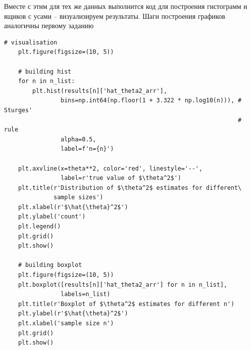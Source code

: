 \documentclass[a4paper, 12pt]{article}
\begin{document}
    Вместе с этим для тех же данных выполнится код для построения гистограмм и ящиков с усами -- визуализируем результаты.
    Шаги построения графиков аналогичны первому заданию
    \begin{lstlisting}[label=graphs2, caption={Код для визуализации результатов}]
    # visualisation
    plt.figure(figsize=(10, 5))

    # building hist
    for n in n_list:
        plt.hist(results[n]['hat_theta2_arr'], 
                bins=np.int64(np.floor(1 + 3.322 * np.log10(n))), # Sturges'
                                                                  # rule
                alpha=0.5, 
                label=f'n={n}')

    plt.axvline(x=theta**2, color='red', linestyle='--',
                label=r'true value of $\theta^2$')
    plt.title(r'Distribution of $\theta^2$ estimates for different\
              sample sizes')
    plt.xlabel(r'$\hat{\theta}^2$')
    plt.ylabel('count')
    plt.legend()
    plt.grid()
    plt.show()

    # building boxplot
    plt.figure(figsize=(10, 5))
    plt.boxplot([results[n]['hat_theta2_arr'] for n in n_list],
                labels=n_list)
    plt.title(r'Boxplot of $\theta^2$ estimates for different n')
    plt.ylabel(r'$\hat{\theta}^2$')
    plt.xlabel('sample size n')
    plt.grid()
    plt.show()
    \end{lstlisting}
\end{document}
